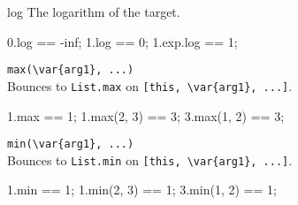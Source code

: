 \begin{urbiscriptapi}

\item[log]
  The logarithm of the target.
\begin{urbiassert}
0.log == -inf;
1.log == 0;
1.exp.log == 1;
\end{urbiassert}

\item \lstinline|max(\var{arg1}, ...)|\\
  Bounces to \lstinline|List.max| on \lstinline|[this, \var{arg1}, ...]|.
\begin{urbiassert}
1.max == 1;
1.max(2, 3) == 3;
3.max(1, 2) == 3;
\end{urbiassert}

\item \lstinline|min(\var{arg1}, ...)|\\
  Bounces to \lstinline|List.min| on \lstinline|[this, \var{arg1}, ...]|.
\begin{urbiassert}
1.min == 1;
1.min(2, 3) == 1;
3.min(1, 2) == 1;
\end{urbiassert}


\end{urbiscriptapi}
